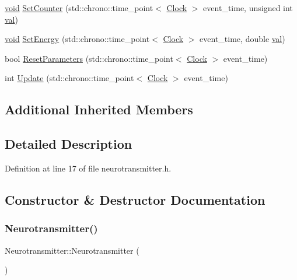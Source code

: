 \begin{DoxyCompactItemize}
\item 
\mbox{\hyperlink{glad_8h_a950fc91edb4504f62f1c577bf4727c29}{void}} \mbox{\hyperlink{class_neurotransmitter_ae16ec051609867d4f64fad5ba4449443}{Set\+Counter}} (std\+::chrono\+::time\+\_\+point$<$ \mbox{\hyperlink{universe_8h_a0ef8d951d1ca5ab3cfaf7ab4c7a6fd80}{Clock}} $>$ event\+\_\+time, unsigned int \mbox{\hyperlink{glad_8h_a26942fd2ed566ef553eae82d2c109c8f}{val}})
\item 
\mbox{\hyperlink{glad_8h_a950fc91edb4504f62f1c577bf4727c29}{void}} \mbox{\hyperlink{class_neurotransmitter_a5ad51ddb1351868e1756e3c41bb88e04}{Set\+Energy}} (std\+::chrono\+::time\+\_\+point$<$ \mbox{\hyperlink{universe_8h_a0ef8d951d1ca5ab3cfaf7ab4c7a6fd80}{Clock}} $>$ event\+\_\+time, double \mbox{\hyperlink{glad_8h_a26942fd2ed566ef553eae82d2c109c8f}{val}})
\item 
bool \mbox{\hyperlink{class_neurotransmitter_a6e7650d738bccfbbd49ede10970687aa}{Reset\+Parameters}} (std\+::chrono\+::time\+\_\+point$<$ \mbox{\hyperlink{universe_8h_a0ef8d951d1ca5ab3cfaf7ab4c7a6fd80}{Clock}} $>$ event\+\_\+time)
\item 
int \mbox{\hyperlink{class_neurotransmitter_ac9f7be22ca7242207de76ec5e1b055b1}{Update}} (std\+::chrono\+::time\+\_\+point$<$ \mbox{\hyperlink{universe_8h_a0ef8d951d1ca5ab3cfaf7ab4c7a6fd80}{Clock}} $>$ event\+\_\+time)
\end{DoxyCompactItemize}
\subsection*{Additional Inherited Members}


\subsection{Detailed Description}


Definition at line 17 of file neurotransmitter.\+h.



\subsection{Constructor \& Destructor Documentation}
\mbox{\label{class_neurotransmitter_a05883c62f2c20b8034121a46c50de00f}} 
\subsubsection{\texorpdfstring{Neurotransmitter()}{Neurotransmitter()}\hspace{0.1cm}{\footnotesize\ttfamily [1/4]}}
{\footnotesize\ttfamily Neurotransmitter\+::\+Neurotransmitter (\begin{DoxyParamCaption}{ }\end{DoxyParamCaption})\hspace{0.3cm}{\ttfamily [inline]}}



